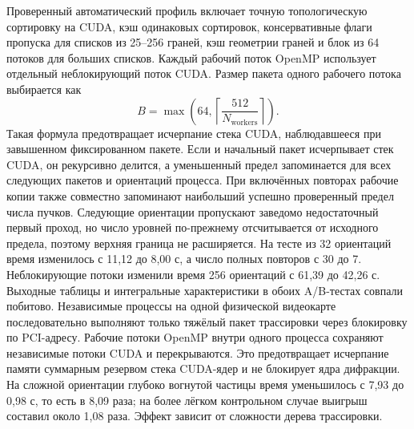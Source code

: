 \documentclass[11pt,a4paper]{article}
\begin{document}
Проверенный автоматический профиль включает точную топологическую сортировку
на CUDA, кэш одинаковых сортировок, консервативные флаги пропуска для списков
из 25--256 граней, кэш геометрии граней и блок из 64 потоков для больших
списков. Каждый рабочий поток OpenMP использует отдельный неблокирующий поток
CUDA. Размер пакета одного рабочего потока выбирается как
\[
  B=\max\!\left(64,
      \left\lceil\frac{512}{N_{\mathrm{workers}}}\right\rceil\right).
\]
Такая формула предотвращает исчерпание стека CUDA, наблюдавшееся при
завышенном фиксированном пакете. Если и начальный пакет исчерпывает стек CUDA,
он рекурсивно делится, а уменьшенный предел запоминается для всех следующих
пакетов и ориентаций процесса. При включённых повторах рабочие копии также
совместно запоминают наибольший успешно проверенный предел числа пучков.
Следующие ориентации пропускают заведомо недостаточный первый проход, но число
уровней по-прежнему отсчитывается от исходного предела, поэтому верхняя граница
не расширяется. На тесте из 32 ориентаций время изменилось с 11,12 до 8,00 с,
а число полных повторов с 30 до 7. Неблокирующие потоки изменили время 256
ориентаций с 61,39 до 42,26 с. Выходные таблицы и интегральные характеристики
в обоих A/B-тестах совпали побитово. Независимые процессы на одной физической
видеокарте последовательно выполняют только тяжёлый пакет трассировки через
блокировку по PCI-адресу. Рабочие потоки OpenMP внутри одного процесса
сохраняют независимые потоки CUDA и перекрываются. Это предотвращает
исчерпание памяти суммарным резервом стека CUDA-ядер и не блокирует ядра
дифракции. На сложной ориентации глубоко вогнутой
частицы время уменьшилось с 7,93 до 0,98 с, то есть в 8,09 раза; на более
лёгком контрольном случае выигрыш составил около 1,08 раза. Эффект зависит от
сложности дерева трассировки.
\end{document}
